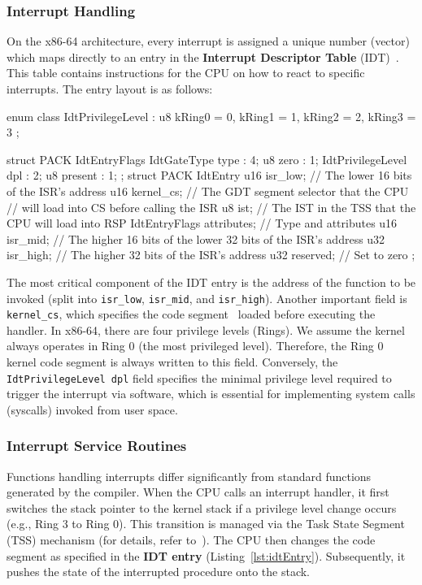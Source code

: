 \documentclass[a4paper,10pt,twoside]{report}
\theoremstyle{definition}
\begin{document}
\subsubsection{Interrupt Handling}
On the x86-64 architecture, every interrupt is assigned a unique number (vector) which maps directly to an entry in the \textbf{Interrupt Descriptor Table} (IDT)~\cite{IntelManual-Interrupts}. This table contains instructions for the CPU on how to react to specific interrupts. The entry layout is as follows:

\begin{cppcode}[caption={IDT Entry Layout}, label={lst:idtEntry}]
  enum class IdtPrivilegeLevel : u8 { kRing0 = 0, kRing1 = 1, kRing2 = 2, kRing3 = 3 };

  struct PACK IdtEntryFlags {
      IdtGateType type : 4;
      u8 zero : 1;
      IdtPrivilegeLevel dpl : 2;
      u8 present : 1;
  };
  struct PACK IdtEntry {
      u16 isr_low;    // The lower 16 bits of the ISR's address
      u16 kernel_cs;  // The GDT segment selector that the CPU
                      //  will load into CS before calling the ISR
      u8 ist;         // The IST in the TSS that the CPU will load into RSP
      IdtEntryFlags attributes;  // Type and attributes
      u16 isr_mid;  // The higher 16 bits of the lower 32 bits of the ISR's address
      u32 isr_high; // The higher 32 bits of the ISR's address
      u32 reserved; // Set to zero
  };
\end{cppcode}

The most critical component of the IDT entry is the address of the function to be invoked (split into \texttt{isr\_low}, \texttt{isr\_mid}, and \texttt{isr\_high}). Another important field is \texttt{kernel\_cs}, which specifies the code segment~\cite{IntelManual-Segments} loaded before executing the handler. In x86-64, there are four privilege levels (Rings). We assume the kernel always operates in Ring 0 (the most privileged level). Therefore, the Ring 0 kernel code segment is always written to this field. Conversely, the \texttt{IdtPrivilegeLevel dpl} field specifies the minimal privilege level required to trigger the interrupt via software, which is essential for implementing system calls (syscalls) invoked from user space.

\subsubsection{Interrupt Service Routines}

Functions handling interrupts differ significantly from standard functions generated by the compiler. When the CPU calls an interrupt handler, it first switches the stack pointer to the kernel stack if a privilege level change occurs (e.g., Ring 3 to Ring 0). This transition is managed via the Task State Segment (TSS) mechanism (for details, refer to~\cite{osdev-tss}). The CPU then changes the code segment as specified in the \textbf{IDT entry} (Listing~\ref{lst:idtEntry}). Subsequently, it pushes the state of the interrupted procedure onto the stack.
\end{document}
